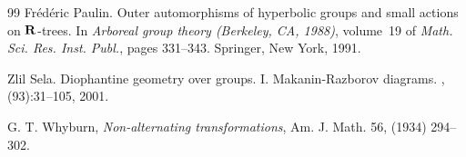 \documentclass[12pt, leqno]{amsart}
\theoremstyle{definition}\newtheorem{definition}[theorem]{Definition}
\begin{document}
\begin{thebibliography}{99}
Fr\'ed\'eric Paulin.
\newblock Outer automorphisms of hyperbolic groups and small actions on {${\bf
  R}$}-trees.
\newblock In {\em Arboreal group theory ({B}erkeley, {CA}, 1988)}, volume~19 of
  {\em Math. Sci. Res. Inst. Publ.}, pages 331--343. Springer, New York, 1991.

Zlil Sela.
\newblock Diophantine geometry over groups. {I}. {M}akanin-{R}azborov diagrams.
, (93):31--105, 2001.

 G. T. Whyburn, \textit{Non-alternating transformations}, Am. J. Math. 56, (1934) 294--302.

\end{thebibliography}
\end{document}
